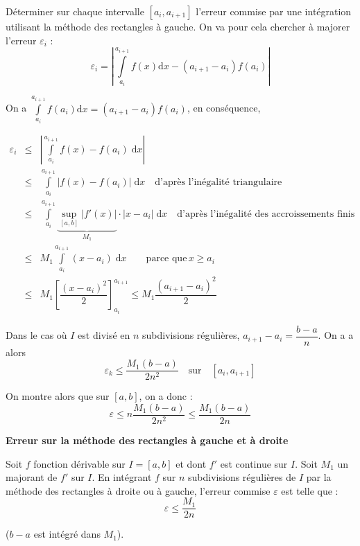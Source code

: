 \documentclass[10pt,fleqn]{article} %
\begin{document}
\begin{obj}
Déterminer sur chaque intervalle $[a_i,a_{i+1}]$ l'erreur commise par une intégration utilisant la méthode des rectangles à gauche. On va pour cela chercher à majorer l'erreur $\varepsilon_i$ :
$$
\varepsilon_i = \left| \int\limits_{a_i}^{a_{i+1}}f(x)\mathrm{d}x -\left(a_{i+1}-a_{i}\right) f(a_i)\right|
$$
\end{obj}

On a $\int\limits_{a_i}^{a_{i+1}}f(a_i)\mathrm{d}x=\left(a_{i+1}-a_{i}\right) f(a_i)$, en conséquence, 

\allowdisplaybreaks

\begin{eqnarray*}
\varepsilon_i &\leq &  \left| \int\limits_{a_i}^{a_{i+1}}f(x) -  f(a_i) \; \mathrm{d}x\right|  \\
&\leq &   \int\limits_{a_i}^{a_{i+1}} \left| f(x) -  f(a_i) \right|\; \mathrm{d}x \quad \text{d'après l'inégalité triangulaire}\\
&\leq &   \int\limits_{a_i}^{a_{i+1}} \underbrace{\underset{[a,b]}{\sup} \left| f'(x)\right|}_{M_1} \cdot \left| x-a_i\right|  \; \mathrm{d}x \quad \text{d'après l'inégalité des accroissements finis}\\
& \leq & M_1 \int\limits_{a_i}^{a_{i+1}}  \left( x-a_i\right)  \; \mathrm{d}x \quad  \quad \text{parce que}\, x\geq a_i\\
& \leq & M_1   \left[ \dfrac{\left(x-a_i\right)^2}{2}\right]_{a_i}^{a_{i+1}} \leq M_1 \dfrac{\left(a_{i+1}-a_i\right)^2}{2}
\end{eqnarray*}

Dans le cas où $I$ est divisé en $n$ subdivisions régulières, $a_{i+1}-a_i = \dfrac{b-a}{n}$. On a a alors 
$$
\varepsilon_k \leq \dfrac{M_1(b-a)}{2n^2} \quad \text{sur}\quad [a_i,a_{i+1}]
$$

On montre alors que sur $[a,b]$, on a donc :
$$
\varepsilon \leq n\dfrac{M_1(b-a)}{2n^2} \leq \dfrac{M_1(b-a)}{2n} 
$$


\begin{resultat}
\textbf{Erreur sur la méthode des rectangles à gauche et à droite}

Soit $f$ fonction dérivable sur $I=[a,b]$ et dont $f'$ est continue sur $I$. Soit $M_1$ un majorant de $f'$ sur $I$. En intégrant $f$ sur $n$ subdivisions régulières de $I$ par la méthode des rectangles à droite ou à gauche, l'erreur commise $\varepsilon$ est telle que : 
$$ \varepsilon \leq \dfrac{M_1}{2n}$$ 

($b-a$ est intégré dans $M_1$).
\end{resultat}
\end{document}
